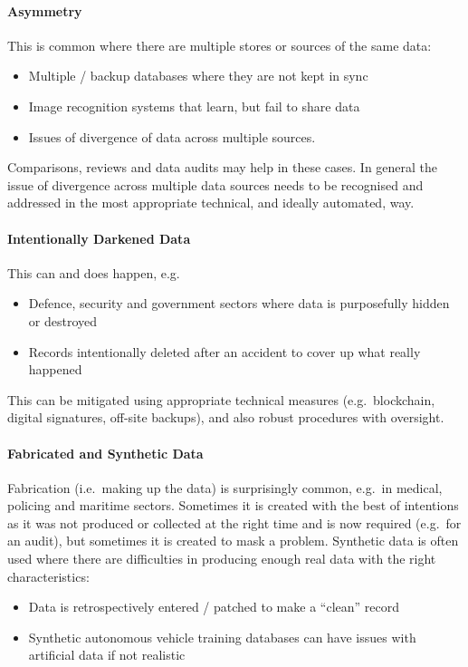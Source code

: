 \paragraph{ Asymmetry}\label{bkm:dark12}
This is common where there are multiple stores or sources of the same data:
\begin{itemize}
\item Multiple / backup \glspl{database} where they are not kept in sync
  \item Image recognition systems that learn, but fail to share data
  \item Issues of divergence of data across multiple sources.
\end{itemize}

Comparisons, reviews and data audits may help in these cases. In general the issue of divergence across multiple data sources needs to be recognised and addressed in the most appropriate technical, and ideally automated, way.

\paragraph{Intentionally Darkened Data}\label{bkm:dark13}
This can and does happen, e.g.
\begin{itemize}
\item Defence, security and government sectors where data is purposefully hidden or destroyed
  \item Records intentionally deleted after an accident to cover up what really happened
\end{itemize}

This can be mitigated using appropriate technical measures (e.g.\ blockchain, digital signatures, off-site backups), and also robust procedures with oversight.

\paragraph{Fabricated and Synthetic Data}\label{bkm:dark14}
Fabrication (i.e.\ making up the data) is surprisingly common, e.g.\ in medical, policing and maritime sectors. Sometimes it is created with the best of intentions as it was not produced or collected at the right time and is now required (e.g.\ for an audit), but sometimes it is created to mask a problem. Synthetic data is often used where there are difficulties in producing enough real data with the right characteristics:
\begin{itemize}
\item Data is retrospectively entered / patched to make a “clean” record
  \item Synthetic autonomous vehicle training \glspl{database} can have issues with artificial data if not realistic
\end{itemize}

